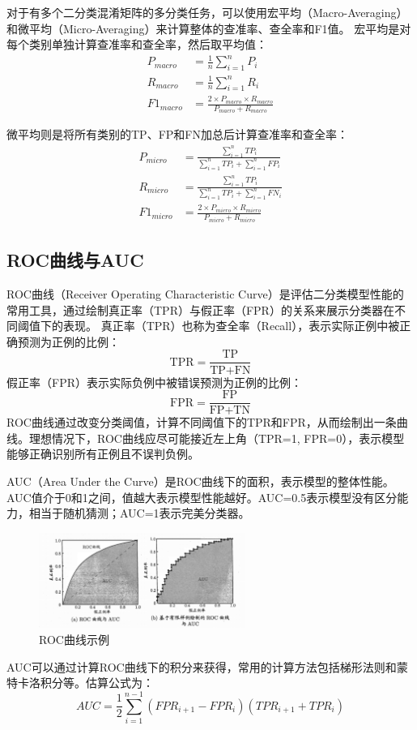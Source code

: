 对于有多个二分类混淆矩阵的多分类任务，可以使用宏平均（Macro-Averaging）和微平均（Micro-Averaging）来计算整体的查准率、查全率和F1值。
宏平均是对每个类别单独计算查准率和查全率，然后取平均值：
\begin{align}
    P_{macro} &= \frac{1}{n} \sum_{i=1}^{n} P_i \nonumber \\
    R_{macro} &= \frac{1}{n} \sum_{i=1}^{n} R_i \nonumber \\
    F1_{macro} &= \frac{2 \times P_{macro} \times R_{macro}}{P_{macro} + R_{macro}}
\end{align}

微平均则是将所有类别的TP、FP和FN加总后计算查准率和查全率：
\begin{align}
    P_{micro} &= \frac{\sum_{i=1}^{n} TP_i}{\sum_{i=1}^{n} TP_i + \sum_{i=1}^{n} FP_i} \nonumber \\
    R_{micro} &= \frac{\sum_{i=1}^{n} TP_i}{\sum_{i=1}^{n} TP_i + \sum_{i=1}^{n} FN_i} \nonumber \\
    F1_{micro} &= \frac{2 \times P_{micro} \times R_{micro}}{P_{micro} + R_{micro}}
\end{align}
\subsection{ROC曲线与AUC}
ROC曲线（Receiver Operating Characteristic Curve）是评估二分类模型性能的常用工具，通过绘制真正率（TPR）与假正率（FPR）的关系来展示分类器在不同阈值下的表现。
真正率（TPR）也称为查全率（Recall），表示实际正例中被正确预测为正例的比例：
\begin{equation}
    \text{TPR} = \frac{\text{TP}}{\text{TP} + \text{FN}}
\end{equation}
假正率（FPR）表示实际负例中被错误预测为正例的比例：
\begin{equation}
    \text{FPR} = \frac{\text{FP}}{\text{FP} + \text{TN}}    
\end{equation}
ROC曲线通过改变分类阈值，计算不同阈值下的TPR和FPR，从而绘制出一条曲线。理想情况下，ROC曲线应尽可能接近左上角（TPR=1, FPR=0），表示模型能够正确识别所有正例且不误判负例。

AUC（Area Under the Curve）是ROC曲线下的面积，表示模型的整体性能。AUC值介于0和1之间，值越大表示模型性能越好。AUC=0.5表示模型没有区分能力，相当于随机猜测；AUC=1表示完美分类器。

\begin{figure}[H]
    \centering
    \includegraphics[width=0.6\textwidth]{static/images/ROC曲线与AUC.png}
    \caption{ROC曲线示例}
    \label{fig:roc_curve}
\end{figure}
AUC可以通过计算ROC曲线下的积分来获得，常用的计算方法包括梯形法则和蒙特卡洛积分等。估算公式为：
\begin{equation}
    AUC = \frac{1}{2} \sum_{i=1}^{n-1} (FPR_{i+1} - FPR_i)(TPR_{i+1} + TPR_i)
\end{equation}


